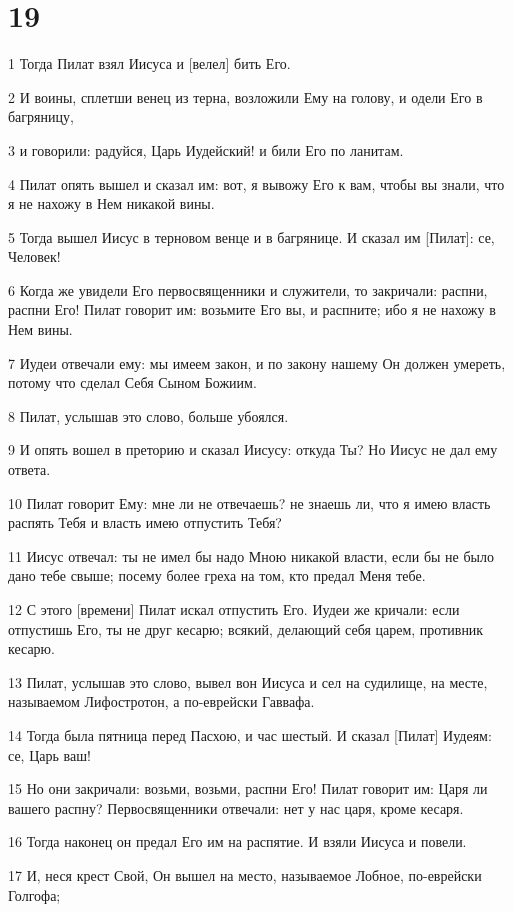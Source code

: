 \chapter{19}

\par 1 Тогда Пилат взял Иисуса и [велел] бить Его.
\par 2 И воины, сплетши венец из терна, возложили Ему на голову, и одели Его в багряницу,
\par 3 и говорили: радуйся, Царь Иудейский! и били Его по ланитам.
\par 4 Пилат опять вышел и сказал им: вот, я вывожу Его к вам, чтобы вы знали, что я не нахожу в Нем никакой вины.
\par 5 Тогда вышел Иисус в терновом венце и в багрянице. И сказал им [Пилат]: се, Человек!
\par 6 Когда же увидели Его первосвященники и служители, то закричали: распни, распни Его! Пилат говорит им: возьмите Его вы, и распните; ибо я не нахожу в Нем вины.
\par 7 Иудеи отвечали ему: мы имеем закон, и по закону нашему Он должен умереть, потому что сделал Себя Сыном Божиим.
\par 8 Пилат, услышав это слово, больше убоялся.
\par 9 И опять вошел в преторию и сказал Иисусу: откуда Ты? Но Иисус не дал ему ответа.
\par 10 Пилат говорит Ему: мне ли не отвечаешь? не знаешь ли, что я имею власть распять Тебя и власть имею отпустить Тебя?
\par 11 Иисус отвечал: ты не имел бы надо Мною никакой власти, если бы не было дано тебе свыше; посему более греха на том, кто предал Меня тебе.
\par 12 С этого [времени] Пилат искал отпустить Его. Иудеи же кричали: если отпустишь Его, ты не друг кесарю; всякий, делающий себя царем, противник кесарю.
\par 13 Пилат, услышав это слово, вывел вон Иисуса и сел на судилище, на месте, называемом Лифостротон, а по-еврейски Гаввафа.
\par 14 Тогда была пятница перед Пасхою, и час шестый. И сказал [Пилат] Иудеям: се, Царь ваш!
\par 15 Но они закричали: возьми, возьми, распни Его! Пилат говорит им: Царя ли вашего распну? Первосвященники отвечали: нет у нас царя, кроме кесаря.
\par 16 Тогда наконец он предал Его им на распятие. И взяли Иисуса и повели.
\par 17 И, неся крест Свой, Он вышел на место, называемое Лобное, по-еврейски Голгофа;
